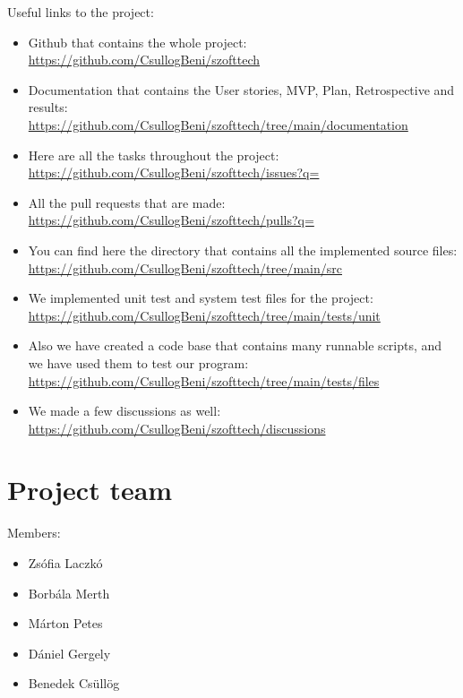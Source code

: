 \documentclass{article}
\begin{document}
Useful links to the project:
\begin{itemize}
    \item Github that contains the whole project: \\ \href{https://github.com/CsullogBeni/szofttech}{https://github.com/CsullogBeni/szofttech}
    \item Documentation that contains the User stories, MVP, Plan, Retrospective and results: \\ \href{https://github.com/CsullogBeni/szofttech/tree/main/documentation}{https://github.com/CsullogBeni/szofttech/tree/main/documentation}
    \item Here are all the tasks throughout the project: \\  \href{https://github.com/CsullogBeni/szofttech/issues?q=}{https://github.com/CsullogBeni/szofttech/issues?q=}
    \item All the pull requests that are made: \\ \href{https://github.com/CsullogBeni/szofttech/pulls?q=}{https://github.com/CsullogBeni/szofttech/pulls?q=}
    \item You can find here the directory that contains all the implemented source files: \\ \href{https://github.com/CsullogBeni/szofttech/tree/main/src}{https://github.com/CsullogBeni/szofttech/tree/main/src}
    \item We implemented unit test and system test files for the project: \\ \href{https://github.com/CsullogBeni/szofttech/tree/main/tests/unit_tests}{https://github.com/CsullogBeni/szofttech/tree/main/tests/unit}
    \item Also we have created a code base that contains many runnable scripts, and we have used them to test our program: \\  \href{https://github.com/CsullogBeni/szofttech/tree/main/tests/test_files}{https://github.com/CsullogBeni/szofttech/tree/main/tests/files}
    \item We made a few discussions as well: \\ \href{https://github.com/CsullogBeni/szofttech/discussions}{https://github.com/CsullogBeni/szofttech/discussions}
\end{itemize}

\section{Project team}
    Members:
    \begin{itemize}
        \item Zsófia Laczkó 
        \item Borbála Merth 
        \item Márton Petes
        \item Dániel Gergely 
        \item Benedek Csüllög
    \end{itemize}
\end{document}
